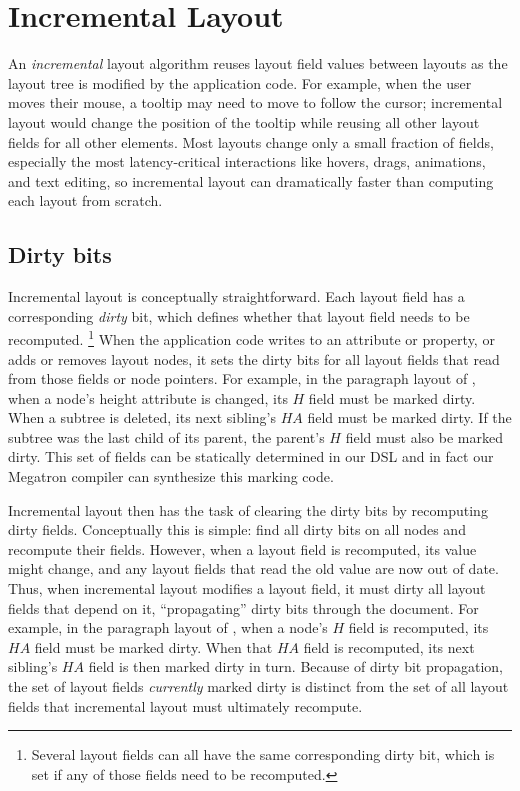 \section{Incremental Layout}

An \emph{incremental} layout algorithm reuses
  layout field values between layouts
  as the layout tree is modified by the application code.
For example, when the user moves their mouse,
  a tooltip may need to move to follow the cursor;
  incremental layout would change the position of the tooltip
  while reusing all other layout fields for all other elements.
Most layouts change only a small fraction of fields,
  especially the most latency-critical interactions
  like hovers, drags, animations, and text editing,
  so incremental layout can dramatically faster
  than computing each layout from scratch.

\subsection{Dirty bits}
\label{sec:recompute-phase}

Incremental layout is conceptually straightforward. 
Each layout field has a corresponding \textit{dirty} bit,
  which defines whether that layout field needs to be recomputed.%
\footnote{Several layout fields can all have
  the same corresponding dirty bit,
  which is set if any of those fields need to be recomputed.}
When the application code
  writes to an attribute or property,
  or adds or removes layout nodes,
  it sets the dirty bits for all layout fields
  that read from those fields or node pointers.
For example,
  in the paragraph layout of ,
  when a node's \textsf{height} attribute is changed,
  its $H$ field must be marked dirty.
When a subtree is deleted,
  its next sibling's $HA$ field must be marked dirty.
If the subtree was the last child of its parent,
  the parent's $H$ field must also be marked dirty.
This set of fields can be statically determined in our DSL
  and in fact our Megatron compiler can synthesize
  this marking code.

Incremental layout then has the task of clearing the dirty bits
  by recomputing dirty fields.
Conceptually this is simple:
  find all dirty bits on all nodes and recompute their fields.
However, when a layout field is recomputed,
  its value might change,
  and any layout fields that read the old value
  are now out of date.
Thus, when incremental layout modifies a layout field,
  it must dirty all layout fields that depend on it,
  ``propagating'' dirty bits through the document.
For example,
  in the paragraph layout of ,
  when a node's $H$ field is recomputed,
  its $HA$ field must be marked dirty.
When that $HA$ field is recomputed,
  its next sibling's $HA$ field is then marked dirty in turn.
Because of dirty bit propagation,
  the set of layout fields \emph{currently} marked dirty
  is distinct from the set of all layout fields
  that incremental layout must ultimately recompute.

